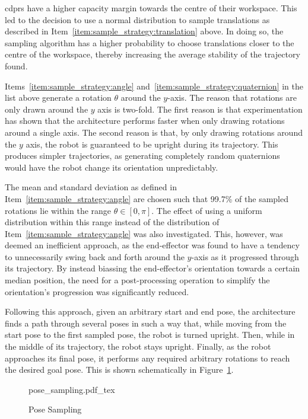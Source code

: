 		\glspl{cdpr} have a higher capacity margin towards the centre of
		their workspace. This led to the decision
		to use a normal distribution to sample translations as described in
		Item~\ref{item:sample_strategy:translation} above. In doing so,
		the sampling algorithm has a higher probability to choose
		translations closer to the centre of the workspace, thereby
		increasing the average stability of the trajectory found.

		Items~\ref{item:sample_strategy:angle}
		and~\ref{item:sample_strategy:quaternion} in the list above generate
		a rotation $\theta$ around the $y$-axis. The reason that rotations
		are only drawn around the $y$ axis is two-fold. The first reason is
		that experimentation has shown that the architecture performs faster
		when only drawing rotations around a single axis. The second reason is that, by only drawing rotations
		around the $y$ axis, the robot is guaranteed to be upright during
		its trajectory. This produces simpler trajectories, as generating
		completely random quaternions would have the robot change its
		orientation unpredictably.

		The mean and standard deviation as defined in
		Item~\ref{item:sample_strategy:angle} are chosen such that 99.7\% of
		the sampled rotations lie within the range $\theta \in [0, \pi]$.
		The effect of using a uniform distribution within this range instead
		of the distribution of Item~\ref{item:sample_strategy:angle} was
		also investigated. This, however, was deemed an inefficient
		approach, as the end-effector was found to have a tendency to
		unnecessarily swing back and forth around the $y$-axis as it
		progressed through its trajectory. By instead biassing the
		end-effector's orientation towards a certain median position, the
		need for a post-processing operation to simplify the orientation's
		progression was significantly reduced.

		Following this approach, given an arbitrary start and end pose, the
		architecture finds a path through several poses in such a way that,
		while moving from the start pose to the first sampled pose, the
		robot is turned upright. Then, while in the middle of its
		trajectory, the robot stays upright. Finally, as the robot
		approaches its final pose, it performs any required arbitrary
		rotations to reach the desired goal pose. This is shown
		schematically in Figure~\ref{fig:pose_sampling}.

		\begin{figure}[hb]
			\centering
			\def\svgwidth{\columnwidth}
			{pose_sampling.pdf_tex}
			\caption{Pose Sampling}%
			\label{fig:pose_sampling}
		\end{figure}


